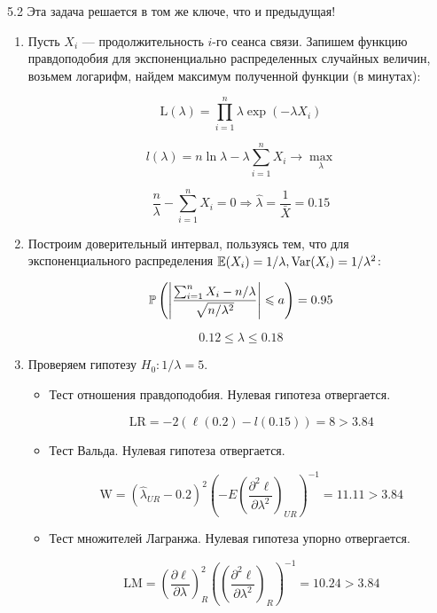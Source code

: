 \protect \hypertarget {soln:5.2}{}
\begin{solution}{{5.2}}
Эта задача решается в том же ключе, что и предыдущая!

\begin{enumerate}
\item Пусть $X_i$ — продолжительность $i$-го сеанса связи. Запишем функцию правдоподобия для экспоненциально распределенных случайных величин, возьмем логарифм, найдем максимум полученной функции (в минутах):

\[\text{L}(\lambda) = \prod_{i=1}^n \lambda \exp(-\lambda X_i)\]

\[l(\lambda) = n \ln \lambda - \lambda \sum_{i=1}^n X_i \to \max_\lambda\]

\[\frac{n}{\lambda} - \sum_{i=1}^{n}X_i = 0 \Rightarrow \hat{\lambda} = \frac{1}{\bar{X}}=0.15\]

\item Построим доверительный интервал, пользуясь тем, что для экспоненциального распределения $\E(X_i) = 1/\lambda, \Var(X_i) = 1/\lambda^2$:

\[\P\left( \left|\frac{\sum_{i=1}^{n}X_i-n/\lambda}{\sqrt{n/\lambda^2}}\right|\leqslant a\right)=0.95\]

\[0.12 \leqslant \lambda \leqslant 0.18\]

\item Проверяем гипотезу $H_0: 1/\lambda = 5$.

\begin{itemize}
  \item Тест отношения правдоподобия. Нулевая гипотеза отвергается.

    \[\text{LR} = -2(\ell(0.2)-l(0.15)) = 8 > 3.84\]

    \item Тест Вальда. Нулевая гипотеза отвергается.

    \[\text{W} = \left(\hat{\lambda}_{UR} - 0.2\right) ^2\left( -E\left(\frac{\partial^2 \ell}{\partial \lambda^2}\right)_{UR}\right)^{-1} = 11.11 > 3.84 \]

        \item Тест множителей Лагранжа. Нулевая гипотеза упорно отвергается.

    \[\text{LM} = \left( \frac{\partial \ell}{\partial\lambda}\right)_R^2 \left( \left(\frac{\partial^2 \ell}{\partial \lambda^2}\right)_{R}\right)^{-1} = 10.24 > 3.84 \]
\end{itemize}
\end{enumerate}
\end{solution}
